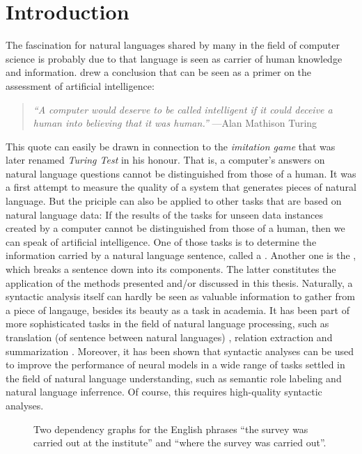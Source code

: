 \documentclass[../document.tex]{subfiles}
\begin{document}
    \chapter{Introduction}
    The fascination for natural languages shared by many in the field of computer science is probably due to that language is seen as carrier of human knowledge and information.
    \citet{Turing50} drew a conclusion that can be seen as a primer on the assessment of artificial intelligence:
    \begin{quote}
        \emph{``A computer would deserve to be called intelligent if it could deceive a human into believing that it was human.''} \hfill ---Alan Mathison Turing
    \end{quote}
    This quote can easily be drawn in connection to the \emph{imitation game} that was later renamed \emph{Turing Test} in his honour.
    That is, a computer's answers on natural language questions cannot be distinguished from those of a human.
    It was a first attempt to measure the quality of a system that generates pieces of natural language.
    But the priciple can also be applied to other tasks that are based on natural language data:
        If the results of the tasks for unseen data instances created by a computer cannot be distinguished from those of a human, then we can speak of artificial intelligence.
    One of those tasks is to determine the information carried by a natural language sentence, called a .
    Another one is the , which breaks a sentence down into its components.
    The latter constitutes the application of the methods presented and/or discussed in this thesis.
    Naturally, a syntactic analysis itself can hardly be seen as valuable information to gather from a piece of langauge, besides its beauty as a task in academia.
    It has been part of more sophisticated tasks in the field of natural language processing, such as translation (of sentence between natural languages) \citep{Zhang19,Yang22}, relation extraction \citep{Ngu19} and summarization \citep{Bal21}.
    Moreover, it has been shown that syntactic analyses can be used to improve the performance of neural models in a wide range of tasks settled in the field of natural language understanding, such as semantic role labeling and natural language inferrence. \citep{Liu19, Wang19, Fei20}
    Of course, this requires high-quality syntactic analyses.
    
    \begin{figure}
        \null\hfill
        
        \hfill
        
        \hfill\null
        \caption{\label{fig:dependency}
            Two dependency graphs for the English phrases ``the survey was carried out at the institute'' and ``where the survey was carried out''.
        }
    \end{figure}
    
\end{document}
